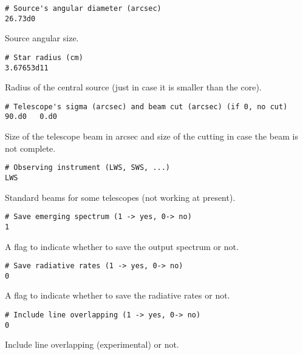 \documentclass[12pt]{article}
\begin{document}
\begin{footnotesize} \begin{verbatim}
# Source's angular diameter (arcsec)
26.73d0
\end{verbatim} \end{footnotesize}
Source angular size.

\begin{footnotesize} \begin{verbatim}
# Star radius (cm)
3.67653d11
\end{verbatim} \end{footnotesize}
Radius of the central source (just in case it is smaller than the core).

\begin{footnotesize} \begin{verbatim}
# Telescope's sigma (arcsec) and beam cut (arcsec) (if 0, no cut)
90.d0   0.d0
\end{verbatim} \end{footnotesize}
Size of the telescope beam in arcsec and size of the cutting in case
the beam is not complete.

\begin{footnotesize} \begin{verbatim}
# Observing instrument (LWS, SWS, ...)
LWS
\end{verbatim} \end{footnotesize}
Standard beams for some telescopes (not working at present).

\begin{footnotesize} \begin{verbatim}
# Save emerging spectrum (1 -> yes, 0-> no)
1
\end{verbatim} \end{footnotesize}
A flag to indicate whether to save the output spectrum or not.

\begin{footnotesize} \begin{verbatim}
# Save radiative rates (1 -> yes, 0-> no)
0
\end{verbatim} \end{footnotesize}
A flag to indicate whether to save the radiative rates or not.

\begin{footnotesize} \begin{verbatim}
# Include line overlapping (1 -> yes, 0-> no)
0
\end{verbatim} \end{footnotesize}
Include line overlapping (experimental) or not.
\end{document}
